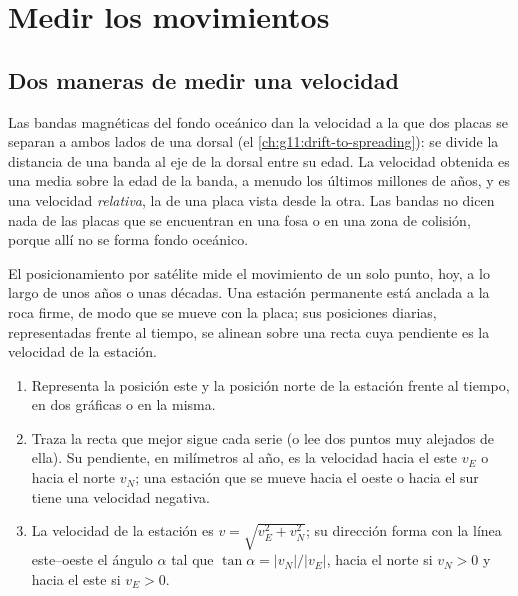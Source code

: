 \section{Medir los movimientos}

\subsection{Dos maneras de medir una velocidad}

Las bandas magnéticas del fondo oceánico dan la velocidad a la que dos placas
se separan a ambos lados de una dorsal (el \cref{ch:g11:drift-to-spreading}):
se divide la distancia de una banda al eje de la dorsal entre su edad. La
velocidad obtenida es una media sobre la edad de la banda, a menudo los
últimos millones de años, y es una velocidad \emph{relativa}, la de una placa
vista desde la otra. Las bandas no dicen nada de las placas que se encuentran
en una fosa o en una zona de colisión, porque allí no se forma fondo oceánico.

El posicionamiento por satélite mide el movimiento de un solo punto, hoy, a lo
largo de unos años o unas décadas. Una estación permanente está anclada a la
roca firme, de modo que se mueve con la placa; sus posiciones diarias,
representadas frente al tiempo, se alinean sobre una recta cuya pendiente es
la velocidad de la estación.

\begin{method}\label{met:g11:plate-motions:rate}
\begin{enumerate}
  \item Representa la posición este y la posición norte de la estación frente
        al tiempo, en dos gráficas o en la misma.
  \item Traza la recta que mejor sigue cada serie (o lee dos puntos muy
        alejados de ella). Su pendiente, en milímetros al año, es la velocidad
        hacia el este $v_E$ o hacia el norte $v_N$; una estación que se mueve
        hacia el oeste o hacia el sur tiene una velocidad negativa.
  \item La velocidad de la estación es $v = \sqrt{v_E^2 + v_N^2}$; su
        dirección forma con la línea este--oeste el ángulo $\alpha$ tal que
        $\tan\alpha = |v_N|/|v_E|$, hacia el norte si $v_N > 0$ y hacia
        el este si $v_E > 0$.
\end{enumerate}
\end{method}

